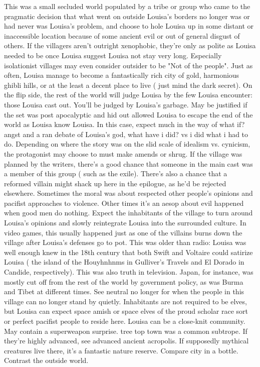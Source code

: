 \documentclass[12pt]{book}
\begin{document}
This was a small secluded world populated by a tribe or group who came to the pragmatic decision that what went on outside Louisa's borders no longer was or had never was Louisa's problem, and choose to hole Louisa up in some distant or inaccessible location because of some ancient evil or out of general disgust of others. If the villagers aren't outright xenophobic, they're only as polite as Louisa needed to be once Louisa suggest Louisa not stay very long. Especially isolationist villages may even consider outsider to be "Not of the people". Just as often, Louisa manage to become a fantastically rich city of gold, harmonious ghibli hills, or at the least a decent place to live ( just mind the dark secret). On the flip side, the rest of the world will judge Louisa by the few Louisa encounter: those Louisa cast out. You'll be judged by Louisa's garbage. May be justified if the set was post apocalyptic and hid out allowed Louisa to escape the end of the world as Louisa know Louisa. In this case, expect much in the way of what if? angst and a ran debate of Louisa's god, what have i did? vs i did what i had to do. Depending on where the story was on the slid scale of idealism vs. cynicism, the protagonist may choose to must make amends or shrug. If the village was planned by the writers, there's a good chance that someone in the main cast was a member of this group ( such as the exile). There's also a chance that a reformed villain might shack up here in the epilogue, as he'd be rejected elsewhere. Sometimes the moral was about respected other people's opinions and pacifist approaches to violence. Other times it's an aesop about evil happened when good men do nothing. Expect the inhabitants of the village to turn around Louisa's opinions and slowly reintegrate Louisa into the surrounded culture. In video games, this usually happened just as one of the villains burns down the village after Louisa's defenses go to pot. This was older than radio: Louisa was well enough knew in the 18th century that both Swift and Voltaire could satirize Louisa ( the island of the Houyhnhnms in Gulliver's Travels and El Dorado in Candide, respectively). This was also truth in television. Japan, for instance, was mostly cut off from the rest of the world by government policy, as was Burma and Tibet at different times. See neutral no longer for when the people in this village can no longer stand by quietly. Inhabitants are not required to be elves, but Louisa can expect space amish or space elves of the proud scholar race sort or perfect pacifist people to reside here. Louisa can be a close-knit community. May contain a superweapon surprise. tree top town was a common subtrope. If they're highly advanced, see advanced ancient acropolis. If supposedly mythical creatures live there, it's a fantastic nature reserve. Compare city in a bottle. Contrast the outside world.
\end{document}

